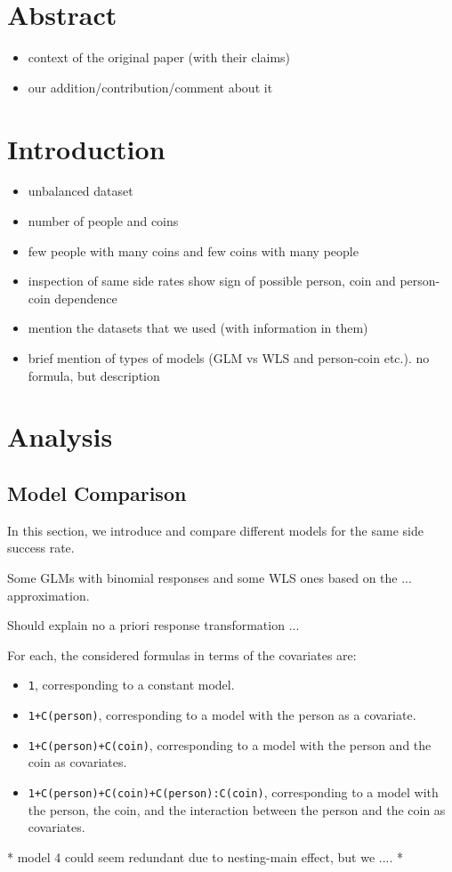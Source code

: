 \documentclass[a4paper, 12pt,oneside]{article}
\begin{document}
 
	 
	\clearpage
	\tableofcontents
	\thispagestyle{empty}
	\clearpage
	\setcounter{page}{1}
	\section*{Abstract}
	\begin{itemize}
		\item context of the original paper (with their claims) 
		\item our addition/contribution/comment about it
	\end{itemize}
	\section{Introduction}
	\begin{itemize}
		\item unbalanced dataset 
		\item number of people and coins
		\item few people with many coins and few coins with many people
		\item inspection of same side rates show sign of possible person, coin and person-coin dependence
		\item mention the datasets that we used (with information in them)
		\item brief mention of types of models (GLM vs WLS and person-coin etc.). no formula, but description
	\end{itemize}
	\section{Analysis}
		\subsection{Model Comparison}
			In this section, we introduce and compare different models for the same side success rate. 

			Some GLMs with binomial responses and some WLS ones based on the ... approximation.
			
			Should explain no a priori response transformation ...
			
			For each, the considered formulas in terms of the covariates are:
			\begin{itemize}
				\item \texttt{1}, corresponding to a constant model.
				\item \texttt{1+C(person)}, corresponding to a model with the person as a covariate.
				\item \texttt{1+C(person)+C(coin)}, corresponding to a model with the person and the coin as covariates.
				\item \texttt{1+C(person)+C(coin)+C(person):C(coin)}, corresponding to a model with the person, the coin, and the interaction between the person and the coin as covariates.
			\end{itemize}
			* model 4 could seem redundant due to nesting-main effect, but we ....
			*  
\end{document}
